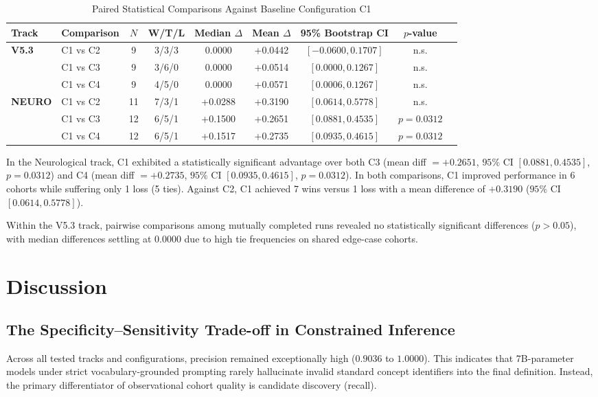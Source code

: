 \begin{table}[htbp]
\centering
\caption{Paired Statistical Comparisons Against Baseline Configuration C1}
\label{tab:paired_stats}
\begin{tabular}{llccccccc}
\hline
\textbf{Track} & \textbf{Comparison} & \textbf{$N$} & \textbf{W/T/L} & \textbf{Median $\Delta$} & \textbf{Mean $\Delta$} & \textbf{95\% Bootstrap CI} & \textbf{$p$-value} \\
\hline
\textbf{V5.3}  & C1 vs C2 & 9  & 3/3/3 & 0.0000 & +0.0442 & $[-0.0600, 0.1707]$ & n.s. \\
               & C1 vs C3 & 9  & 3/6/0 & 0.0000 & +0.0514 & $[0.0000, 0.1267]$  & n.s. \\
               & C1 vs C4 & 9  & 4/5/0 & 0.0000 & +0.0571 & $[0.0006, 0.1267]$  & n.s. \\
\hline
\textbf{NEURO} & C1 vs C2 & 11 & 7/3/1 & +0.0288 & +0.3190 & $[0.0614, 0.5778]$ & n.s. \\
               & C1 vs C3 & 12 & 6/5/1 & +0.1500 & +0.2651 & $[0.0881, 0.4535]$ & $p = 0.0312$ \\
               & C1 vs C4 & 12 & 6/5/1 & +0.1517 & +0.2735 & $[0.0935, 0.4615]$ & $p = 0.0312$ \\
\hline
\end{tabular}
\end{table}

In the Neurological track, C1 exhibited a statistically significant advantage over both C3 (mean diff $= +0.2651$, $95\%$ CI $[0.0881, 0.4535]$, $p = 0.0312$) and C4 (mean diff $= +0.2735$, $95\%$ CI $[0.0935, 0.4615]$, $p = 0.0312$). In both comparisons, C1 improved performance in 6 cohorts while suffering only 1 loss (5 ties). Against C2, C1 achieved 7 wins versus 1 loss with a mean difference of $+0.3190$ ($95\%$ CI $[0.0614, 0.5778]$).

Within the V5.3 track, pairwise comparisons among mutually completed runs revealed no statistically significant differences ($p > 0.05$), with median differences settling at $0.0000$ due to high tie frequencies on shared edge-case cohorts.

\section{Discussion}

\subsection{The Specificity--Sensitivity Trade-off in Constrained Inference}
Across all tested tracks and configurations, precision remained exceptionally high ($0.9036$ to $1.0000$). This indicates that 7B-parameter models under strict vocabulary-grounded prompting rarely hallucinate invalid standard concept identifiers into the final definition. Instead, the primary differentiator of observational cohort quality is candidate discovery (recall).

